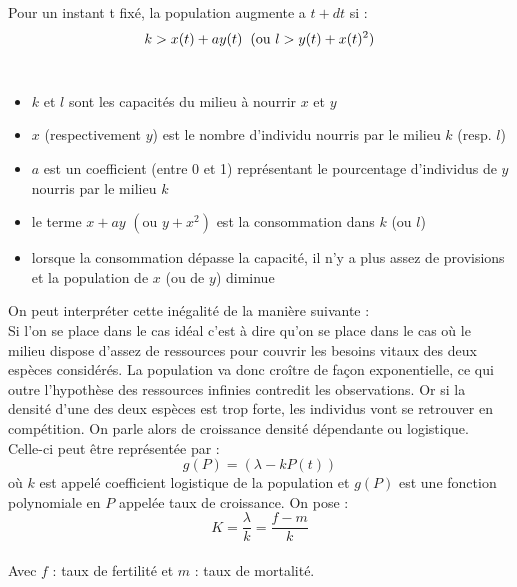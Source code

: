\documentclass{article}
\begin{document}
\noindent
Pour un instant t fixé, la population augmente a $t + dt$ si :
\begin{equation*}
    k > x(t) + a y(t) \hspace{0.2cm} \text{(ou } l> y(t) + x(t)^{2}) 
\end{equation*}\\
\begin{itemize}
    \item $k$ et $l$ sont les capacités du milieu à nourrir $x$ et $y$
    \item $x$ (respectivement $y$) est le nombre d'individu nourris par le milieu $k$ (resp. $l$)
    \item $a$ est un coefficient (entre 0 et 1) représentant le pourcentage d'individus de $y$ nourris par le milieu $k$
    \item le terme $x + a y$ $(\text{ou } y+ x^{2})$ est la consommation dans $k$ (ou $l$)
    \item lorsque la consommation dépasse la capacité, il n'y a plus assez de provisions et la population de $x$ (ou de $y$) diminue
\end{itemize}

\vspace{1cm}
On peut interpréter cette inégalité de la manière suivante :\\

Si l'on se place dans le cas idéal c'est à dire qu'on se place dans le cas où le milieu dispose d'assez de ressources pour couvrir les besoins vitaux des deux espèces considérés. La population va donc croître de façon exponentielle, ce qui outre l'hypothèse des ressources infinies contredit les observations. Or si la densité d'une des deux espèces est trop forte, les individus vont se retrouver en compétition. On parle alors de croissance densité dépendante ou logistique.\\

\vspace{0.5cm}
Celle-ci peut être représentée par :
\begin{equation}
\label{eq:g}
\tag{G}
    g(P) = (\lambda-kP(t))
\end{equation}
où $k$ est appelé coefficient logistique de la population et $g(P)$ est une fonction polynomiale en $P$ appelée taux de croissance.
On pose : 
\begin{equation*}
    K = \frac{\lambda}{k}= \frac{f-m}{k}
\end{equation*}\\

Avec $f$ : taux de fertilité et $m$ : taux de mortalité.\\
\end{document}
